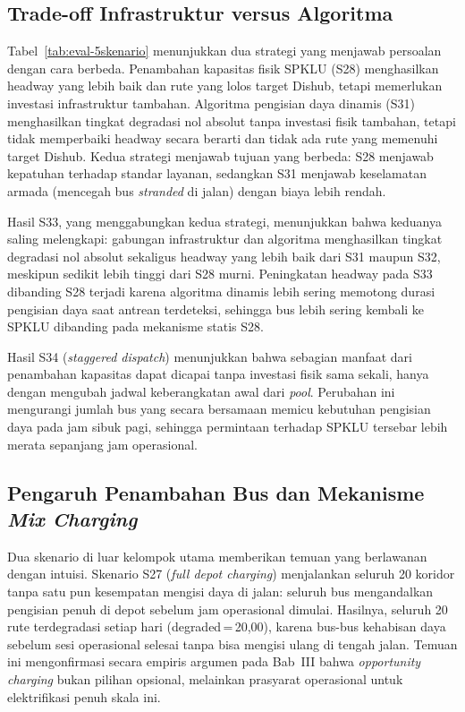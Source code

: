 \subsection{Trade-off Infrastruktur versus Algoritma}

Tabel~\ref{tab:eval-5skenario} menunjukkan dua strategi yang menjawab
persoalan dengan cara berbeda. Penambahan kapasitas fisik SPKLU (S28)
menghasilkan headway yang lebih baik dan rute yang lolos target Dishub,
tetapi memerlukan investasi infrastruktur tambahan. Algoritma pengisian
daya dinamis (S31) menghasilkan tingkat degradasi nol absolut tanpa
investasi fisik tambahan, tetapi tidak memperbaiki headway secara berarti
dan tidak ada rute yang memenuhi target Dishub. Kedua strategi menjawab
tujuan yang berbeda: S28 menjawab kepatuhan terhadap standar layanan,
sedangkan S31 menjawab keselamatan armada (mencegah bus \textit{stranded}
di jalan) dengan biaya lebih rendah.

Hasil S33, yang menggabungkan kedua strategi, menunjukkan bahwa keduanya
saling melengkapi: gabungan infrastruktur dan algoritma menghasilkan
tingkat degradasi nol absolut sekaligus headway yang lebih baik dari S31
maupun S32, meskipun sedikit lebih tinggi dari S28 murni. Peningkatan
headway pada S33 dibanding S28 terjadi karena algoritma dinamis lebih
sering memotong durasi pengisian daya saat antrean terdeteksi, sehingga
bus lebih sering kembali ke SPKLU dibanding pada mekanisme statis S28.

Hasil S34 (\textit{staggered dispatch}) menunjukkan bahwa sebagian
manfaat dari penambahan kapasitas dapat dicapai tanpa investasi fisik
sama sekali, hanya dengan mengubah jadwal keberangkatan awal dari
\textit{pool}. Perubahan ini mengurangi jumlah bus yang secara bersamaan
memicu kebutuhan pengisian daya pada jam sibuk pagi, sehingga permintaan
terhadap SPKLU tersebar lebih merata sepanjang jam operasional.

\subsection{Pengaruh Penambahan Bus dan Mekanisme \textit{Mix Charging}}

Dua skenario di luar kelompok utama memberikan temuan yang berlawanan
dengan intuisi. Skenario S27 (\textit{full depot charging}) menjalankan
seluruh 20 koridor tanpa satu pun kesempatan mengisi daya di jalan: seluruh
bus mengandalkan pengisian penuh di depot sebelum jam operasional dimulai.
Hasilnya, seluruh 20 rute terdegradasi setiap hari (degraded\,=\,20,00),
karena bus-bus kehabisan daya sebelum sesi operasional selesai tanpa bisa
mengisi ulang di tengah jalan. Temuan ini mengonfirmasi secara empiris
argumen pada Bab~III bahwa \textit{opportunity charging} bukan pilihan
opsional, melainkan prasyarat operasional untuk elektrifikasi penuh skala
ini.

